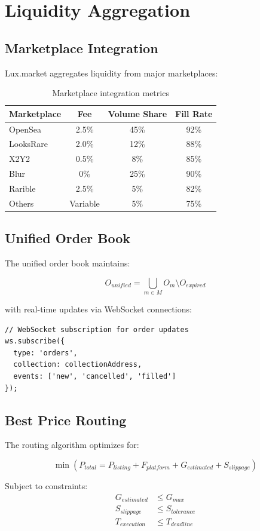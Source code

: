 \section{Liquidity Aggregation}


\subsection{Marketplace Integration}

Lux.market aggregates liquidity from major marketplaces:

\begin{table}[h]
\centering
\begin{tabular}{|l|c|c|c|}
\hline
\textbf{Marketplace} & \textbf{Fee} & \textbf{Volume Share} & \textbf{Fill Rate} \\
\hline
OpenSea & 2.5\% & 45\% & 92\% \\
LooksRare & 2.0\% & 12\% & 88\% \\
X2Y2 & 0.5\% & 8\% & 85\% \\
Blur & 0\% & 25\% & 90\% \\
Rarible & 2.5\% & 5\% & 82\% \\
Others & Variable & 5\% & 75\% \\
\hline
\end{tabular}
\caption{Marketplace integration metrics}
\end{table}

\subsection{Unified Order Book}

The unified order book maintains:

\begin{equation}
O_{unified} = \bigcup_{m \in M} O_m \setminus O_{expired}
\end{equation}

with real-time updates via WebSocket connections:

\begin{lstlisting}[language=Solidity]
// WebSocket subscription for order updates
ws.subscribe({
  type: 'orders',
  collection: collectionAddress,
  events: ['new', 'cancelled', 'filled']
});
\end{lstlisting}

\subsection{Best Price Routing}

The routing algorithm optimizes for:

\begin{equation}
\min \left( P_{total} = P_{listing} + F_{platform} + G_{estimated} + S_{slippage} \right)
\end{equation}

Subject to constraints:
\begin{align}
G_{estimated} &\leq G_{max} \\
S_{slippage} &\leq S_{tolerance} \\
T_{execution} &\leq T_{deadline}
\end{align}

